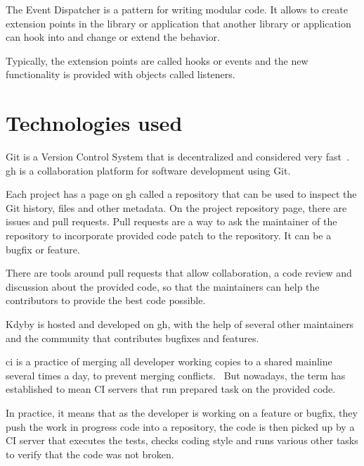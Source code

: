  \label{sec:theory:event-dispatcher}

The Event Dispatcher is a pattern for writing modular code. It allows to create extension points in the library or application that another library or application can hook into and change or extend the behavior.

Typically, the extension points are called hooks or events and the new functionality is provided with objects called listeners.

\section{Technologies used}

 \label{sec:theory:git}

Git is a Version Control System that is decentralized and considered very fast~\cite{progit}. \gls{gh} is a collaboration platform for software development using Git.

Each project has a page on \gls{gh} called a repository that can be used to inspect the Git history, files and other metadata. On the project repository page, there are issues and pull requests. Pull requests are a way to ask the maintainer of the repository to incorporate provided code patch to the repository. It can be a bugfix or feature.

There are tools around pull requests that allow collaboration, a code review and discussion about the provided code, so that the maintainers can help the contributors to provide the best code possible.

Kdyby is hosted and developed on \gls{gh}, with the help of several other maintainers and the community that contributes bugfixes and features.

 \label{sec:theory:ci}

\gls{ci} is a practice of merging all developer working copies to a shared mainline several times a day, to prevent merging conflicts.~\cite{wiki:ci} But nowadays, the term has established to mean CI servers that run prepared task on the provided code.

In practice, it means that as the developer is working on a feature or bugfix, they push the work in progress code into a repository, the code is then picked up by a CI server that executes the tests, checks coding style and runs various other tasks to verify that the code was not broken.

